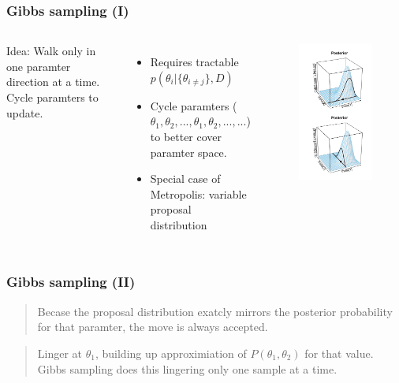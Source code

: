 \documentclass[usenames,dvipsnames,table]{beamer}
\begin{document}
\begin{frame}
\frametitle{Gibbs sampling (I)}
\begin{columns}[c]
Idea: Walk only in one paramter direction at a time. Cycle paramters to update.
\begin{itemize}
\item Requires tractable $p(\theta_i|\{\theta_{i\neq j}\}, D)$
\item Cycle paramters ($\theta_1, \theta_2, ..., \theta_1, \theta_2, ..., ...$) to better cover paramter space.
\item Special case of Metropolis: variable proposal distribution
\end{itemize}
\begin{figure}
\centering
\includegraphics[height=0.8\textheight]{img/fig7_7}
\end{figure}
\end{columns}
\end{frame}

\begin{frame}
\frametitle{Gibbs sampling (II)}
\begin{quote}
Becase the proposal distribution exatcly mirrors the posterior probability for that paramter, the move is always accepted.
\end{quote}
\begin{quote}
Linger at $\theta_1$, building up approximiation of $P(\theta_1, \theta_2)$ for that value. Gibbs sampling does this lingering only one sample at a time.
\end{quote}
\end{frame}
\end{document}
